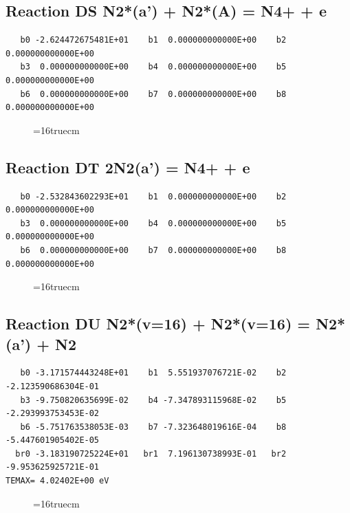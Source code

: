 \documentclass[12pt,dvipdfm]{article}
\begin{document}
\subsection{
Reaction DS N2*(a') + N2*(A) = N4+ + e}
\begin{small}\begin{verbatim}
   b0 -2.624472675481E+01    b1  0.000000000000E+00    b2  0.000000000000E+00
   b3  0.000000000000E+00    b4  0.000000000000E+00    b5  0.000000000000E+00
   b6  0.000000000000E+00    b7  0.000000000000E+00    b8  0.000000000000E+00
   \end{verbatim}\end{small}
\begin{figure}[h!]
\label{n2rates}
\epsfxsize=16truecm
\end{figure}
\newpage

\subsection{
Reaction DT 2N2(a') = N4+ + e }
\begin{small}\begin{verbatim}
   b0 -2.532843602293E+01    b1  0.000000000000E+00    b2  0.000000000000E+00
   b3  0.000000000000E+00    b4  0.000000000000E+00    b5  0.000000000000E+00
   b6  0.000000000000E+00    b7  0.000000000000E+00    b8  0.000000000000E+00
   \end{verbatim}\end{small}
\begin{figure}[h!]
\label{n2rates}
\epsfxsize=16truecm
\end{figure}
\newpage

\subsection{
Reaction DU N2*(v=16) + N2*(v=16) = N2*(a') + N2}
\begin{small}\begin{verbatim}
   b0 -3.171574443248E+01    b1  5.551937076721E-02    b2 -2.123590686304E-01
   b3 -9.750820635699E-02    b4 -7.347893115968E-02    b5 -2.293993753453E-02
   b6 -5.751763538053E-03    b7 -7.323648019616E-04    b8 -5.447601905402E-05
  br0 -3.183190725224E+01   br1  7.196130738993E-01   br2 -9.953625925721E-01
TEMAX= 4.02402E+00 eV
   \end{verbatim}\end{small}
\begin{figure}[h!]
\label{n2rates}
\epsfxsize=16truecm
\end{figure}
\newpage
\end{document}
